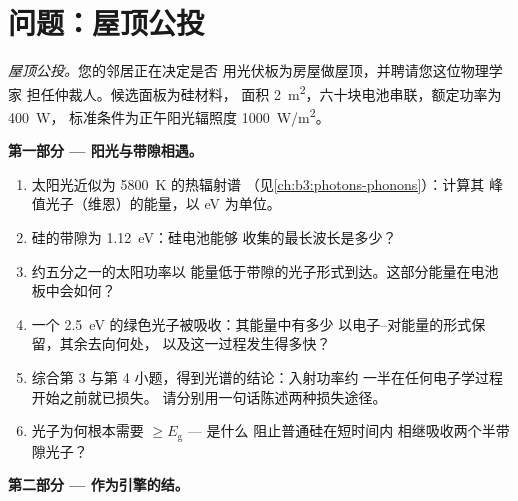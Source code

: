 \section{问题：屋顶公投}

\begin{problem}\label{pb:b3:electrons-in-solids:1}
\emph{屋顶公投。}您的邻居正在决定是否
用光伏板为房屋做屋顶，并聘请您这位物理学家
担任仲裁人。候选面板为硅材料，
面积 \qty{2}{m^2}，六十块电池串联，额定功率为 \qty{400}{W}，
标准条件为正午阳光辐照度 \qty{1000}{W/m^2}。

\medskip\noindent\textbf{第一部分 --- 阳光与带隙相遇。}

\begin{enumerate}
  \item 太阳光近似为 \qty{5800}{K} 的热辐射谱
        （见\cref{ch:b3:photons-phonons}）：计算其
        峰值光子（维恩）的能量，以 eV 为单位。
  \item 硅的带隙为 \qty{1.12}{eV}：硅电池能够
        收集的最长波长是多少？
  \item 约五分之一的太阳功率以
        能量低于带隙的光子形式到达。这部分能量在电池板中会如何？
  \item 一个 \qty{2.5}{eV} 的绿色光子被吸收：其能量中有多少
        以电子–对能量的形式保留，其余去向何处，
        以及这一过程发生得多快？
  \item 综合第 3 与第 4 小题，得到光谱的结论：入射功率约
        一半在任何电子学过程开始之前就已损失。
        请分别用一句话陈述两种损失途径。
  \item 光子为何根本需要 $\ge E_{\text{g}}$ --- 是什么
        阻止普通硅在短时间内
        相继吸收两个半带隙光子？
\end{enumerate}

\medskip\noindent\textbf{第二部分 --- 作为引擎的结。}


\end{problem}
